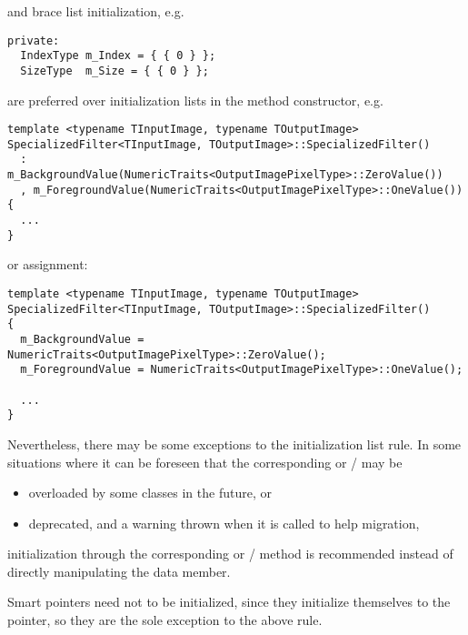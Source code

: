 and brace list initialization, e.g.

\small
\begin{verbatim}
private:
  IndexType m_Index = { { 0 } };
  SizeType  m_Size = { { 0 } };
\end{verbatim}
\normalsize

are preferred over initialization lists in the method constructor, e.g.

\small
\begin{verbatim}
template <typename TInputImage, typename TOutputImage>
SpecializedFilter<TInputImage, TOutputImage>::SpecializedFilter()
  : m_BackgroundValue(NumericTraits<OutputImagePixelType>::ZeroValue())
  , m_ForegroundValue(NumericTraits<OutputImagePixelType>::OneValue())
{
  ...
}
\end{verbatim}
\normalsize

or assignment:

\small
\begin{verbatim}
template <typename TInputImage, typename TOutputImage>
SpecializedFilter<TInputImage, TOutputImage>::SpecializedFilter()
{
  m_BackgroundValue = NumericTraits<OutputImagePixelType>::ZeroValue();
  m_ForegroundValue = NumericTraits<OutputImagePixelType>::OneValue();

  ...
}
\end{verbatim}
\normalsize

Nevertheless, there may be some exceptions to the initialization list rule. In
some situations where it can be foreseen that the corresponding
 or / may be

\begin{itemize}
\item overloaded by some classes in the future, or
\item deprecated, and a warning thrown when it is called to help migration,
\end{itemize}

initialization through the corresponding  or
/ method is recommended instead of directly
manipulating the data member.

Smart pointers need not to be initialized, since they initialize themselves
to the  pointer, so they are the sole exception to the above rule.

